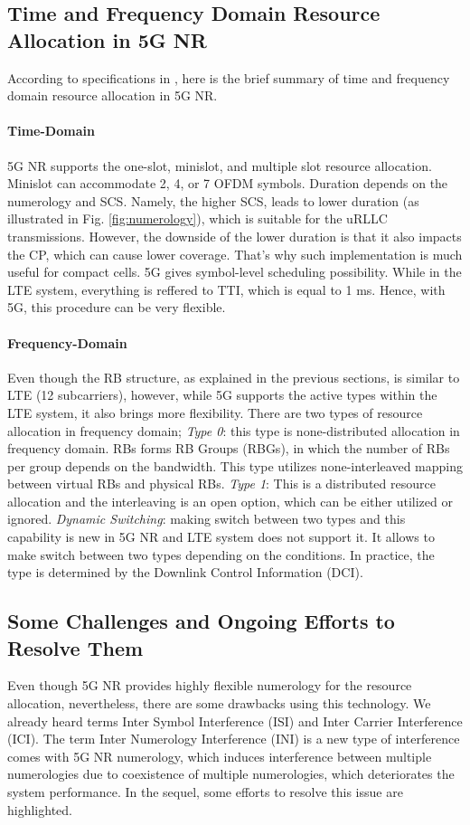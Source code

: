 \documentclass[journal,draftclsnofoot,onecolumn,12pt]{IEEEtran}
\theoremstyle{definition}
\begin{document}
\subsection{Time and Frequency Domain Resource Allocation in 5G NR}
\label{subsec:time_freq_allocation}
According to specifications in \cite{3GPP_Rel17}, here is the brief summary of time and frequency domain resource allocation in 5G NR. 
\paragraph{Time-Domain} 5G NR supports the one-slot, minislot, and multiple slot resource allocation. Minislot can accommodate 2, 4, or 7 OFDM symbols. Duration depends on the numerology and SCS. Namely, the higher SCS, leads to lower duration (as illustrated in Fig. \ref{fig:numerology}), which is suitable for the uRLLC transmissions. However, the downside of the lower duration is that it also impacts the CP, which can cause lower coverage. That's why such implementation is much useful for compact cells. 5G gives symbol-level scheduling possibility. While in the LTE system, everything is reffered to TTI, which is equal to 1 ms. Hence, with 5G, this procedure can be very flexible.   
\paragraph{Frequency-Domain} Even though the RB structure, as explained in the previous sections, is similar to LTE (12 subcarriers), however, while 5G supports the active types within the LTE system, it also brings more flexibility. There are two types of resource allocation in frequency domain; \textit{Type 0}: this type is none-distributed allocation in frequency domain. RBs forms RB Groups (RBGs), in which the number of RBs per group depends on the bandwidth. This type utilizes none-interleaved mapping between virtual RBs and physical RBs. \textit{Type 1}: This is a distributed resource allocation and the interleaving is an open option, which can be either utilized or ignored. \textit{Dynamic Switching}: making switch between two types and this capability is new in 5G NR and LTE system does not support it. It allows to make switch between two types depending on the conditions. In practice, the type is determined by the Downlink Control Information (DCI). 
\subsection{Some Challenges and Ongoing Efforts to Resolve Them}
\label{subsec:challenges}
Even though 5G NR provides highly flexible numerology for the resource allocation, nevertheless, there are some drawbacks using this technology. We already heard terms Inter Symbol Interference (ISI) and Inter Carrier Interference (ICI). The term Inter Numerology Interference (INI) is a new type of interference comes with 5G NR numerology, which induces interference between multiple numerologies due to coexistence of multiple numerologies, which deteriorates the system performance. In the sequel, some efforts to resolve this issue are highlighted. 
\end{document}
